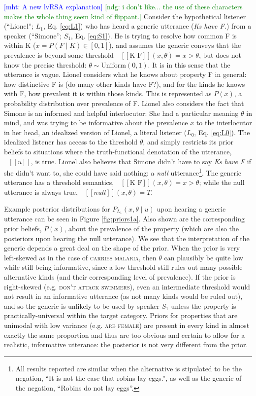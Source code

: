 \documentclass[10pt,letterpaper]{article}
\newcommand{\denote}[1]{\mbox{ $[\![ #1 ]\!]$}}
\newcommand{\ndg}[1]{\textcolor{Green}{[ndg: #1]}}
\newcommand{\mht}[1]{\textcolor{Blue}{[mht: #1]}}
\begin{document}
\mht{A new lvRSA explanation}
\ndg{i don't like... the use of these characters makes the whole thing seem kind of flippant.}
Consider the hypothetical listener (``Lionel''; $L_{1}$, Eq. \ref{eq:L1}) who has heard a generic utterance (\emph{Ks have F.}) from a speaker (``Simone''; $S_{1}$, Eq. \ref{eq:S1}). 
He is trying to resolve how common F is within K ($x = P(F\mid K) \in [0, 1]$), and assumes the generic conveys that the prevalence is beyond some threshold $\denote{\text{K F}}(x, \theta)=x>\theta$, but does not know the precise threshold: $\theta \sim \text{Uniform}(0,1)$.
It is in this sense that the utterance is vague.
Lionel considers what he knows about property F in general: how distinctive F is (do many other kinds have F?), and for the kinds he knows with F, how prevalent it is within those kinds.
This is represented as $P(x)$, a probability distribution over prevalence of F.
Lionel also considers the fact that Simone is an informed and helpful interlocutor: She had a particular meaning $\theta$ in mind, and was trying to be informative about the prevalence $x$ to the interlocutor in her head, an idealized version of Lionel, a literal listener ($L_{0}$, Eq. \ref{eq:L0}).
The idealized listener has access to the threshold $\theta$, and simply restricts its prior beliefs to situations where the truth-functional denotation of the utterance, $\denote{u}$, is true.
Lionel also believes that Simone didn't have to say \emph{Ks have F} if she didn't want to, she could have said nothing: a \emph{null} utterance\footnote{All results reported are similar when the alternative is stipulated to be the negation,  ``It is not the case that robins lay eggs.'', as well as the generic of the negation, ``Robins do not lay eggs''.}. 
The generic utterance has a threshold semantics, $\denote{\text{K F}}(x, \theta)=x>\theta$; while the null utterance is always true, $\denote{null}(x, \theta)=T$.



Example posterior distributions for $P_{L_{1}}(x , \theta \mid u)$ upon hearing a generic utterance can be seen in Figure \ref{fig:priors1a}. 
Also shown are the corresponding prior beliefs, $P(x)$, about the prevalence of the property (which are also the posteriors upon hearing the null utterance).
We see that the interpretation of the generic depends a great deal on the shape of the prior.
When the prior is very left-skewed as in the case of \textsc{carries malaria}, then $\theta$ can plausibly be quite low while still being informative, since a low threshold still rules out many possible alternative kinds (and their corresponding level of prevalence).
If the prior is right-skewed (e.g. \textsc{don't attack swimmers}), even an intermediate threshold would not result in an informative utterance (as not many kinds would be ruled out), and so the generic is unlikely to be used by speaker $S_1$ unless the property is practically-universal within the target category. 
Priors for properties that are unimodal with low variance (e.g. \textsc{are female}) are present in every kind in almost exactly the same proportion and thus are too obvious and certain to allow for a realistic, informative utterance: the posterior is not very different from the prior. 
\end{document}
